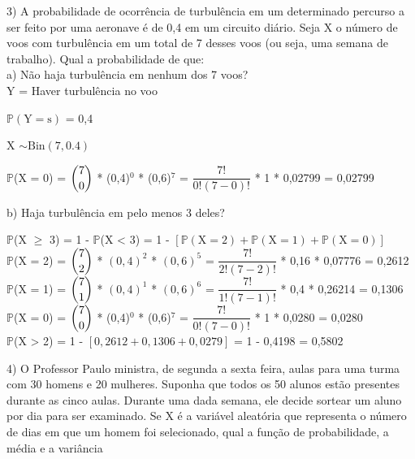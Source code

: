 \documentclass[12pt,a4paper,draft]{article}
\begin{document}
	3) A probabilidade de ocorrência de turbulência em um determinado percurso a ser feito por uma aeronave é de 0,4 em um circuito diário. Seja X o número de voos	com turbulência em um total de 7 desses voos (ou seja, uma semana de trabalho). Qual a probabilidade de que:\\
	a) Não haja turbulência em nenhum dos 7 voos?
	\vspace{0.5cm}\\
	Y = Haver turbulência no voo
	\begin{center}
		\vspace{1cm}
		$\mathbb{P}\left(\text{Y} = \text{s}\right)$ = 0,4
		\vspace{1cm}\\
	\end{center}
	X $\sim \text{Bin}(7, 0.4)$
	\vspace{1cm}\\
	\begin{center}
		$\mathbb{P}$(X = 0) = $\dbinom{7}{0}$ * (0,4)$^{0}$ * (0,6)$^7$ = $\dfrac{7!}{0!(7-0)!}$ * 1 * 0,02799 = 0,02799
	\end{center}
	\vspace{1cm}
	b) Haja turbulência em pelo menos 3 deles?
	\vspace{0.5cm}\\
	\begin{center}
		$\mathbb{P}$(X $\geq$ 3) = 1 - $\mathbb{P}$(X < 3) = 1 - $\left[\mathbb{P}(\text{X} = 2) + \mathbb{P}(\text{X} = 1) + \mathbb{P}(\text{X} = 0)\right]$
		\vspace{0.5cm}\\
		$\mathbb{P}$(X = 2) = $\dbinom{7}{2}$ * $\left(0,4\right)^2$ * $\left(0,6\right)^5$ = $\dfrac{7!}{2!(7-2)!}$ * 0,16 * 0,07776 = 0,2612
		\vspace{0.5cm}\\
		$\mathbb{P}$(X = 1) = $\dbinom{7}{1}$ * $\left(0,4\right)^1$ * $\left(0,6\right)^6$ = $\dfrac{7!}{1!(7-1)!}$ * 0,4 * 0,26214 = 0,1306
		\vspace{0.5cm}\\
		$\mathbb{P}$(X = 0) = $\dbinom{7}{0}$ * (0,4)$^0$ * (0,6)$^7$ = $\dfrac{7!}{0!(7-0)!}$ * 1 * 0,0280 = 0,0280
		\vspace{0.5cm}\\
		$\mathbb{P}$(X > 2) = 1 - $\left[0,2612 + 0,1306 + 0,0279\right]$ = 1 - 0,4198 = 0,5802
	\end{center}
	\vspace{1cm}
	4) O Professor Paulo ministra, de segunda a sexta feira, aulas para uma turma com 30 homens e 20 mulheres. Suponha que todos os 50 alunos estão presentes durante as cinco aulas. Durante uma dada semana, ele decide sortear um aluno por dia para ser examinado. Se X é a variável aleatória que representa o número de dias em que um homem foi selecionado, qual a função de probabilidade, a média e a variância
\end{document}
